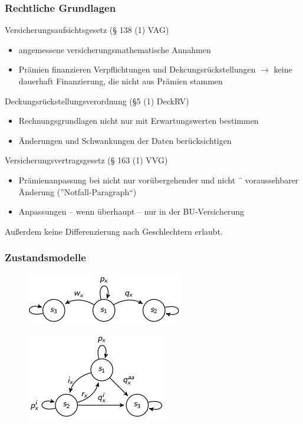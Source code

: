 \documentclass[12pt]{report}
\theoremstyle{dotless}
\theoremstyle{definition}
\begin{document}
\subsubsection{Rechtliche Grundlagen}
Versicherungsaufsichtsgesetz (§ 138 (1) VAG)
\begin{itemize}
\item angemessene versicherungsmathematische Annahmen
\item Prämien finanzieren Verpflichtungen und Dekcungsrückstellungen $\rightarrow$ keine dauerhaft Finanzierung, die nicht aus Prämien stammen
\end{itemize}

Deckungsrückstellungsverordnung (§5 (1) DeckRV)
\begin{itemize}
\item Rechnungsgrundlagen nicht nur mit Erwartungswerten bestimmen
\item Änderungen und Schwankungen der Daten berücksichtigen
\end{itemize}

Versicherungsvertragsgesetz (§ 163 (1) VVG)
\begin{itemize}
\item Prämienanpassung bei nicht nur vorübergehender und nicht ¨
voraussehbarer Änderung  (”Notfall-Paragraph“)
\item Anpassungen – wenn überhaupt – nur in der BU-Versicherung
\end{itemize}

Außerdem keine Differenzierung nach Geschlechtern erlaubt.

\subsubsection{Zustandsmodelle}
\begin{figure}[ht]
	\centering
	\includegraphics[scale=1.2]{Bilder/Zustandsmodell_Leben1.png}
\end{figure}
\begin{figure}[ht]
	\centering
	\includegraphics[scale=1.2]{Bilder/Zustandsmodell_Leben2.png}
\end{figure}
\end{document}
